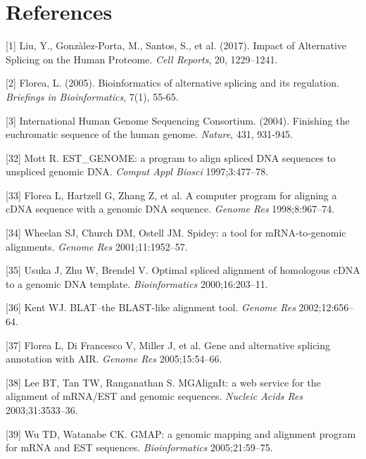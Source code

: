 \documentclass[12pt,a4paper]{article}
\begin{document}
\section{References}

[1] Liu, Y., Gonzàlez-Porta, M., Santos, S., et al. (2017). Impact of Alternative Splicing on the Human Proteome. \textit{Cell Reports}, 20, 1229–1241.

[2] Florea, L. (2005). Bioinformatics of alternative splicing and its regulation. \textit{Briefings in Bioinformatics}, 7(1), 55-65.

[3] International Human Genome Sequencing Consortium. (2004). Finishing the euchromatic sequence of the human genome. \textit{Nature}, 431, 931-945.

[32] Mott R. EST\_GENOME: a program to align spliced DNA sequences to unspliced genomic DNA. \textit{Comput Appl Biosci} 1997;3:477–78.

[33] Florea L, Hartzell G, Zhang Z, et al. A computer program for aligning a cDNA sequence with a genomic DNA sequence. \textit{Genome Res} 1998;8:967–74.

[34] Wheelan SJ, Church DM, Ostell JM. Spidey: a tool for mRNA-to-genomic alignments. \textit{Genome Res} 2001;11:1952–57.

[35] Usuka J, Zhu W, Brendel V. Optimal spliced alignment of homologous cDNA to a genomic DNA template. \textit{Bioinformatics} 2000;16:203–11.

[36] Kent WJ. BLAT–the BLAST-like alignment tool. \textit{Genome Res} 2002;12:656–64.

[37] Florea L, Di Francesco V, Miller J, et al. Gene and alternative splicing annotation with AIR. \textit{Genome Res} 2005;15:54–66.

[38] Lee BT, Tan TW, Ranganathan S. MGAlignIt: a web service for the alignment of mRNA/EST and genomic sequences. \textit{Nucleic Acids Res} 2003;31:3533–36.

[39] Wu TD, Watanabe CK. GMAP: a genomic mapping and alignment program for mRNA and EST sequences. \textit{Bioinformatics} 2005;21:59–75.
\end{document}
